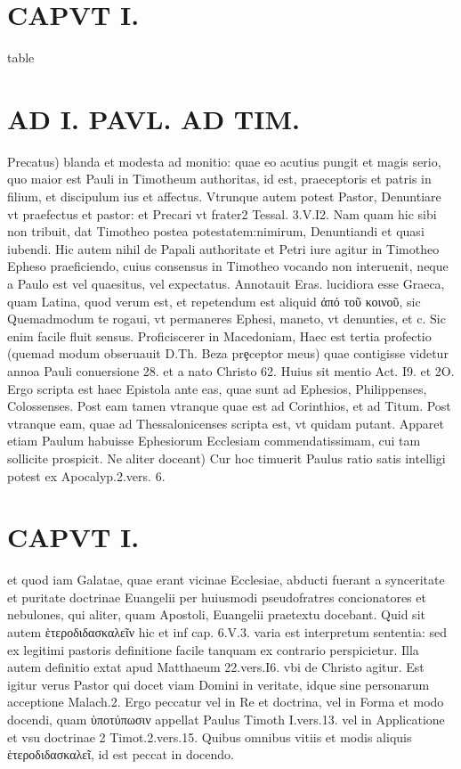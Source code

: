 \documentclass{article}
\begin{document}
\begin{pages}
\section*{CAPVT  I. }
\marginpar{[ p.7 ]}\pstart table  \pend
\section*{AD I. PAVL. AD TIM. }
\marginpar{[ p.8 ]}\pstart Precatus) blanda et modesta ad monitio: quae eo acutius pungit et magis serio, quo maior est Pauli in Timotheum authoritas, id est, praeceptoris et patris in filium, et discipulum ius et affectus. Vtrunque autem potest Pastor, Denuntiare vt praefectus et pastor: et Precari vt frater2 Tessal. 3.V.I2. Nam quam hic sibi non tribuit, dat Timotheo postea potestatem:nimirum, Denuntiandi et quasi iubendi. Hic autem nihil de Papali authoritate et Petri iure agitur in Timotheo Epheso praeficiendo, cuius consensus in Timotheo vocando non interuenit, neque a Paulo est vel quaesitus, vel expectatus. Annotauit Eras. lucidiora esse Graeca, quam Latina, quod verum est, et repetendum est aliquid ἀπό τοῦ κοινοῦ, sic Quemadmodum te rogaui, vt permaneres Ephesi, maneto, vt denunties, et c. Sic enim facile fluit sensus. Proficiscerer in Macedoniam, Haec est tertia profectio (quemad modum obseruauit D.Th. Beza prȩceptor meus) quae contigisse videtur annoa Pauli conuersione 28. et a nato Christo 62. Huius sit mentio Act. I9. et 2O. Ergo scripta est haec Epistola ante eas, quae sunt ad Ephesios, Philippenses, Colossenses. Post eam tamen vtranque quae est ad Corinthios, et ad Titum. Post vtranque eam, quae ad Thessalonicenses scripta est, vt quidam putant. Apparet etiam Paulum habuisse Ephesiorum Ecclesiam commendatissimam, cui tam sollicite prospicit. Ne aliter doceant) Cur hoc timuerit Paulus ratio satis intelligi potest ex Apocalyp.2.vers. 6.  \pend
\section*{CAPVT  I. }
\marginpar{[ p.9 ]}\pstart et quod iam Galatae, quae erant vicinae Ecclesiae, abducti fuerant a synceritate et puritate doctrinae Euangelii per huiusmodi pseudofratres concionatores et nebulones, qui aliter, quam Apostoli, Euangelii praetextu docebant. Quid sit autem ἑτεροδιδασκαλεῖν hic et inf cap. 6.V.3. varia est interpretum sententia: sed ex legitimi pastoris definitione facile tanquam ex contrario perspicietur. Illa autem definitio extat apud Matthaeum 22.vers.I6. vbi de Christo agitur. Est igitur verus Pastor qui docet viam Domini in veritate, idque sine personarum acceptione Malach.2. Ergo peccatur vel in Re et doctrina, vel in Forma et modo docendi, quam ὑποτύπωσιν appellat Paulus  Timoth I.vers.13. vel in Applicatione et vsu doctrinae 2 Timot.2.vers.15. Quibus omnibus vitiis et modis aliquis ἑτεροδιδασκαλεῖ, id est peccat in docendo.  \pend\pstart {}
{}

\end{pages}
\end{document}
